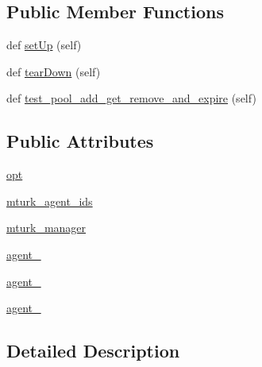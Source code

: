 \subsection*{Public Member Functions}
\begin{DoxyCompactItemize}
\item 
def \hyperlink{classparlai_1_1mturk_1_1core_1_1test_1_1test__mturk__manager_1_1TestMTurkManagerPoolHandling_a2da1d08e0c0abf9ff9b52918731df726}{set\+Up} (self)
\item 
def \hyperlink{classparlai_1_1mturk_1_1core_1_1test_1_1test__mturk__manager_1_1TestMTurkManagerPoolHandling_a9488af956bff1ee47e03dcfd01a32398}{tear\+Down} (self)
\item 
def \hyperlink{classparlai_1_1mturk_1_1core_1_1test_1_1test__mturk__manager_1_1TestMTurkManagerPoolHandling_a5695f4bee19708321eb50ef6373a3aa2}{test\+\_\+pool\+\_\+add\+\_\+get\+\_\+remove\+\_\+and\+\_\+expire} (self)
\end{DoxyCompactItemize}
\subsection*{Public Attributes}
\begin{DoxyCompactItemize}
\item 
\hyperlink{classparlai_1_1mturk_1_1core_1_1test_1_1test__mturk__manager_1_1TestMTurkManagerPoolHandling_a4895fed88d427fecba80bfaeffdb4593}{opt}
\item 
\hyperlink{classparlai_1_1mturk_1_1core_1_1test_1_1test__mturk__manager_1_1TestMTurkManagerPoolHandling_a0c87ad047d474e92368f0d011c57b48d}{mturk\+\_\+agent\+\_\+ids}
\item 
\hyperlink{classparlai_1_1mturk_1_1core_1_1test_1_1test__mturk__manager_1_1TestMTurkManagerPoolHandling_a2f338994c141e8461621a74a4d8f42ae}{mturk\+\_\+manager}
\item 
\hyperlink{classparlai_1_1mturk_1_1core_1_1test_1_1test__mturk__manager_1_1TestMTurkManagerPoolHandling_a59131f0fadad672f2b28623196b1dc0f}{agent\+\_}
\item 
\hyperlink{classparlai_1_1mturk_1_1core_1_1test_1_1test__mturk__manager_1_1TestMTurkManagerPoolHandling_afed656e088daad95505051c01e86c2c0}{agent\+\_}
\item 
\hyperlink{classparlai_1_1mturk_1_1core_1_1test_1_1test__mturk__manager_1_1TestMTurkManagerPoolHandling_a81504af6fd91297fbf6271d46ed30a1c}{agent\+\_}
\end{DoxyCompactItemize}


\subsection{Detailed Description}


